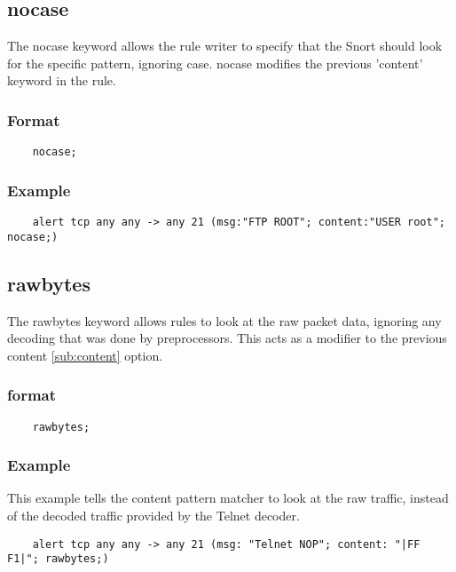 \documentclass[english]{report}
\begin{document}
\subsection{nocase}
\label{sub:nocase}

The nocase keyword allows the rule writer to specify that the Snort should look
for the specific pattern, ignoring case.  nocase modifies the previous
'content' keyword in the rule.

\subsubsection{Format}

\begin{verbatim}
    nocase;
\end{verbatim}

\subsubsection{Example}

\begin{verbatim}
    alert tcp any any -> any 21 (msg:"FTP ROOT"; content:"USER root"; nocase;)
\end{verbatim}

\subsection{rawbytes}
\label{sub:rawbytes}

The rawbytes keyword allows rules to look at the raw packet data, ignoring any
decoding that was done by preprocessors.  This acts as a modifier to the
previous content \ref{sub:content} option. 

\subsubsection{format}

\begin{verbatim}
    rawbytes;
\end{verbatim}

\subsubsection{Example}

This example tells the content pattern matcher to look at the raw traffic,
instead of the decoded traffic provided by the Telnet decoder.

\begin{verbatim}
    alert tcp any any -> any 21 (msg: "Telnet NOP"; content: "|FF F1|"; rawbytes;)
\end{verbatim}
\end{document}
